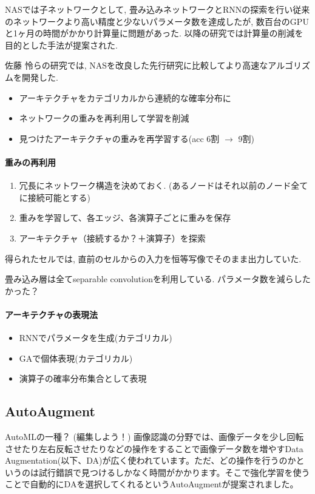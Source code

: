 \documentclass[twocolumn]{jarticle}     %
\begin{document}
NASでは子ネットワークとして, 畳み込みネットワークとRNNの探索を行い従来のネットワークより高い精度と少ないパラメータ数を達成したが, 数百台のGPUと1ヶ月の時間がかかり計算量に問題があった.
以降の研究では計算量の削減を目的とした手法が提案された.

佐藤 怜ら\cite{ANAS}の研究では, NASを改良した先行研究に比較してより高速なアルゴリズムを開発した.

\begin{itemize}
  \item アーキテクチャをカテゴリカルから連続的な確率分布に
  \item ネットワークの重みを再利用して学習を削減
  \item 見つけたアーキテクチャの重みを再学習する(acc 6割 $\rightarrow$ 9割)
\end{itemize}

\paragraph{重みの再利用}
\begin{enumerate}
  \item 冗長にネットワーク構造を決めておく. (あるノードはそれ以前のノード全てに接続可能とする)
  \item 重みを学習して、各エッジ、各演算子ごとに重みを保存
  \item アーキテクチャ（接続するか？＋演算子）を探索
\end{enumerate}

得られたセルでは,
直前のセルからの入力を恒等写像でそのまま出力していた.

畳み込み層は全てseparable convolutionを利用している. パラメータ数を減らしたかった？

\paragraph{アーキテクチャの表現法}
\begin{itemize}
  \item RNNでパラメータを生成(カテゴリカル)
  \item GAで個体表現(カテゴリカル)
  \item 演算子の確率分布集合として表現
\end{itemize}

\subsection{AutoAugment}
\cite{DBLP:journals/corr/abs-1805-09501}
AutoMLの一種？
(編集しよう！)
画像認識の分野では、画像データを少し回転させたり左右反転させたりなどの操作をすることで画像データ数を増やすData Augmentation(以下、DA)が広く使われています。ただ、どの操作を行うのかというのは試行錯誤で見つけるしかなく時間がかかります。そこで強化学習を使うことで自動的にDAを選択してくれるというAutoAugmentが提案されました。
\end{document}
